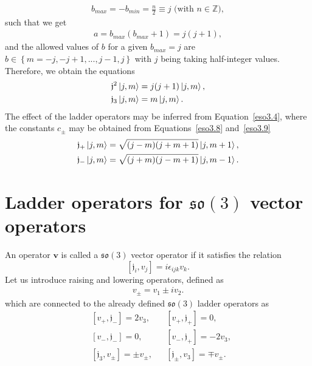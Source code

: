 \documentclass[12pt,a4paper]{report}
\theoremstyle{definition}
\theoremstyle{remark}
\theoremstyle{remark}
\begin{document}
\begin{align*}
b_{max}=-b_{min}=\frac{n}{2}\equiv j \text{ (with }n\in\mathbb{Z}),
\end{align*}
such that we get
\begin{align*}
a=b_{max}(b_{max}+1)=j(j+1),
\end{align*}
and the allowed values of $b$ for a given $b_{max}=j$ are $b\in\left\lbrace m=-j,-j+1,...,j-1,j \right\rbrace$ with $j$ being taking half-integer values.
Therefore, we obtain the equations
\begin{equation}\label{eso3.20}
\begin{aligned}
\mathfrak{j}^2\ket{j,m}&=j(j+1)\ket{j,m},\\
\mathfrak{j}_3\ket{j,m}&=m\ket{j,m}.
\end{aligned}
\end{equation}
The effect of the ladder operators may be inferred from Equation~\ref{eso3.4}, where the constants $c_\pm$ may be obtained from Equations~\ref{eso3.8} and~\ref{eso3.9}
\begin{equation}
\begin{aligned}\label{eso3.16}
\mathfrak{j}_+\ket{j,m}&=\sqrt{(j-m)(j+m+1)}\ket{j,m+1},\\
\mathfrak{j}_-\ket{j,m}&=\sqrt{(j+m)(j-m+1)}\ket{j,m-1}.
\end{aligned}
\end{equation}

\section{Ladder operators for $\mathfrak{so}(3)$ vector operators}\label{ladderso3}
An operator $\mathbf{v}$ is called a $\mathfrak{so}(3)$ vector operator if it satisfies the relation
\begin{equation}\label{eso3.10}
[\mathfrak{j}_i,v_j]=i\epsilon_{ijk}v_k.
\end{equation}
Let us introduce raising and lowering operators, defined as
\begin{align*}
v_\pm=v_1\pm iv_2.
\end{align*}
which are connected to the already defined $\mathfrak{so}(3)$ ladder operators as
\begin{equation}\label{eso3.11}
\begin{aligned}
&[v_+,\mathfrak{j}_-]=2v_3, &&[v_+,\mathfrak{j}_+]=0, \\
&[v_-,\mathfrak{j}_-]=0, &&[v_-,\mathfrak{j}_+]=-2v_3, \\
&[\mathfrak{j}_3,v_\pm]=\pm v_\pm, &&[\mathfrak{j}_\pm,v_3]=\mp v_\pm.
\end{aligned}
\end{equation}
\end{document}
